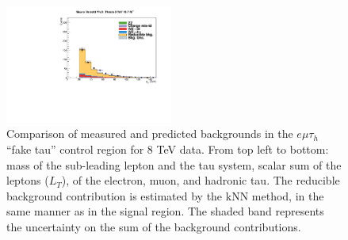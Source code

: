 \begin{figure}
\begin{center}
  \includegraphics[width=0.49\textwidth]{4_Analisys/pics/8TeV/plots/emt/f3/Full/final-f3-tPt-Full.pdf}
  \caption{Comparison of measured and predicted backgrounds in the $e\mu\tau_h$ ``fake tau'' control region for 8 TeV data.
  From top left to bottom: mass of the sub-leading lepton and the tau system, scalar sum of the leptons \pT ($L_T$), \pT of the electron, muon, and hadronic tau.
  The reducible background contribution is estimated by the kNN method, in the same manner as in the signal region.
  The shaded band represents the uncertainty on the sum of the background contributions.
  }
  \label{fig:LLT_emt_f3_control_8TeV}
\end{center}
\end{figure}


